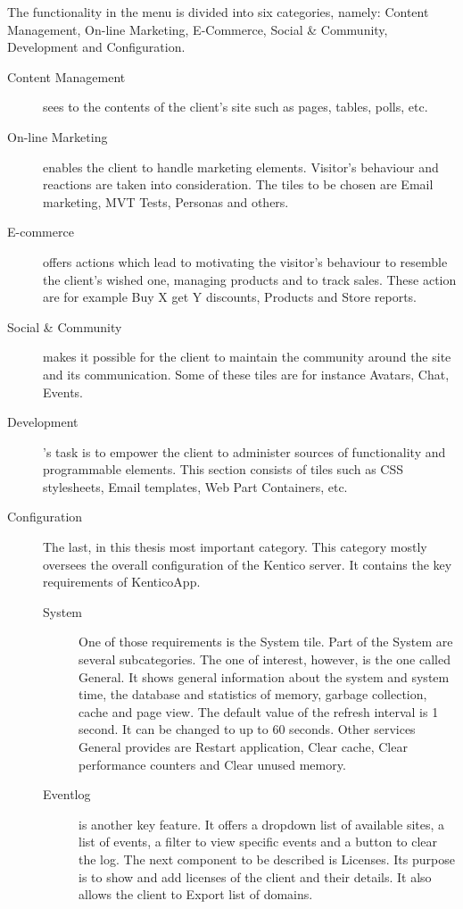 The functionality in the menu is divided into six categories, namely: Content Management, On-line Marketing, E-Commerce, Social \& Community, Development and Configuration. 
\begin{description}
\item [Content Management] sees to the contents of the client's site such as pages, tables, polls, etc. 
\item [On-line Marketing] enables the client to handle marketing elements. Visitor's behaviour and reactions are taken into consideration. The tiles to be chosen are Email marketing, MVT Tests, Personas and others. 
\item [E-commerce] offers actions which lead to motivating the visitor's behaviour to resemble the client's wished one, managing products and to track sales. These action are for example Buy X get Y discounts, Products and Store reports. 
\item [Social \& Community] makes it possible for the client to maintain the community around the site and its communication. Some of these tiles are for instance Avatars, Chat, Events. 
\item [Development]'s task is to empower the client to administer sources of functionality and programmable elements. This section consists of tiles such as CSS stylesheets, Email templates, Web Part Containers, etc. 
\item [Configuration] The last, in this thesis most important category. This category mostly oversees the overall configuration of the Kentico server. It contains the key requirements of KenticoApp.
	\begin {description}
	\item [System] One of those requirements is the System tile. Part of the System are several subcategories. The one of interest, however, is the one called General. It shows general information about the system and system time, the database and statistics of memory, garbage collection, cache and page view. The default value of the refresh interval is 1 second. It can be changed to up to 60 seconds. Other services General provides are Restart application, Clear cache, Clear performance counters and Clear unused memory. 
	\item [Eventlog] is another key feature. It offers a dropdown list of available sites, a list of events, a filter to view specific events and a button to clear the log. 
	The next component to be described is Licenses. Its purpose is to show and add licenses of the client and their details. It also allows the client to Export list of domains. 

\end{description}
\end{description}
